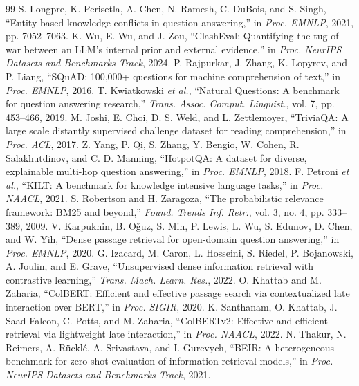 \documentclass[conference]{IEEEtran}
\begin{document}
\begin{thebibliography}{99}
 S. Longpre, K. Perisetla, A. Chen, N. Ramesh, C. DuBois, and S. Singh, ``Entity-based knowledge conflicts in question answering,'' in \emph{Proc. EMNLP}, 2021, pp. 7052--7063.
 K. Wu, E. Wu, and J. Zou, ``ClashEval: Quantifying the tug-of-war between an LLM's internal prior and external evidence,'' in \emph{Proc. NeurIPS Datasets and Benchmarks Track}, 2024.
 P. Rajpurkar, J. Zhang, K. Lopyrev, and P. Liang, ``SQuAD: 100,000+ questions for machine comprehension of text,'' in \emph{Proc. EMNLP}, 2016.
 T. Kwiatkowski \emph{et al.}, ``Natural Questions: A benchmark for question answering research,'' \emph{Trans. Assoc. Comput. Linguist.}, vol. 7, pp. 453--466, 2019.
 M. Joshi, E. Choi, D. S. Weld, and L. Zettlemoyer, ``TriviaQA: A large scale distantly supervised challenge dataset for reading comprehension,'' in \emph{Proc. ACL}, 2017.
 Z. Yang, P. Qi, S. Zhang, Y. Bengio, W. Cohen, R. Salakhutdinov, and C. D. Manning, ``HotpotQA: A dataset for diverse, explainable multi-hop question answering,'' in \emph{Proc. EMNLP}, 2018.
 F. Petroni \emph{et al.}, ``KILT: A benchmark for knowledge intensive language tasks,'' in \emph{Proc. NAACL}, 2021.
 S. Robertson and H. Zaragoza, ``The probabilistic relevance framework: BM25 and beyond,'' \emph{Found. Trends Inf. Retr.}, vol. 3, no. 4, pp. 333--389, 2009.
 V. Karpukhin, B. O\u{g}uz, S. Min, P. Lewis, L. Wu, S. Edunov, D. Chen, and W. Yih, ``Dense passage retrieval for open-domain question answering,'' in \emph{Proc. EMNLP}, 2020.
 G. Izacard, M. Caron, L. Hosseini, S. Riedel, P. Bojanowski, A. Joulin, and E. Grave, ``Unsupervised dense information retrieval with contrastive learning,'' \emph{Trans. Mach. Learn. Res.}, 2022.
 O. Khattab and M. Zaharia, ``ColBERT: Efficient and effective passage search via contextualized late interaction over BERT,'' in \emph{Proc. SIGIR}, 2020.
 K. Santhanam, O. Khattab, J. Saad-Falcon, C. Potts, and M. Zaharia, ``ColBERTv2: Effective and efficient retrieval via lightweight late interaction,'' in \emph{Proc. NAACL}, 2022.
 N. Thakur, N. Reimers, A. R\"uckl\'e, A. Srivastava, and I. Gurevych, ``BEIR: A heterogeneous benchmark for zero-shot evaluation of information retrieval models,'' in \emph{Proc. NeurIPS Datasets and Benchmarks Track}, 2021.

\end{thebibliography}
\end{document}
